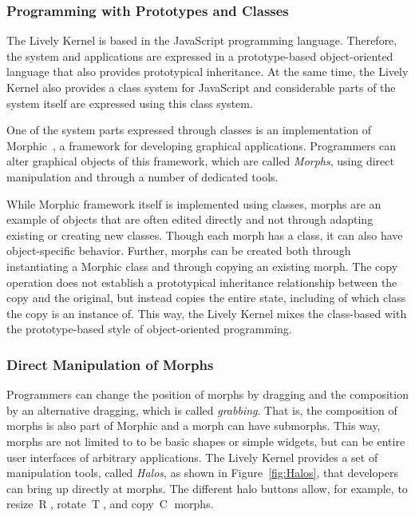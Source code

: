 \subsubsection{Programming with Prototypes and Classes}

The Lively Kernel is based in the JavaScript programming language.
Therefore, the system and applications are expressed in a prototype-based object-oriented language that also provides prototypical inheritance.
At the same time, the Lively Kernel also provides a class system for JavaScript and considerable parts of the system itself are expressed using this class system.

One of the system parts expressed through classes is an implementation of Morphic~\cite{Maloney1995Mor}, a framework for developing graphical applications.
Programmers can alter graphical objects of this framework, which are called \emph{Morphs}, using direct manipulation and through a number of dedicated tools.

While Morphic framework itself is implemented using classes, morphs are an example of objects that are often edited directly and not through adapting existing or creating new classes.
Though each morph has a class, it can also have object-specific behavior.
Further, morphs can be created both through instantiating a Morphic class and through copying an existing morph.
The copy operation does not establish a prototypical inheritance relationship between the copy and the original, but instead copies the entire state, including of which class the copy is an instance of.
This way, the Lively Kernel mixes the class-based with the prototype-based style of object-oriented programming.

\subsubsection{Direct Manipulation of Morphs}

Programmers can change the position of morphs by dragging and the composition by an alternative dragging, which is called \emph{grabbing}.
That is, the composition of morphs is also part of Morphic and a morph can have submorphs.
This way, morphs are not limited to to be basic shapes or simple widgets, but can be entire user interfaces of arbitrary applications.
The Lively Kernel provides a set of manipulation tools, called \emph{Halos}, as shown in Figure~\ref{fig:Halos}, that developers can bring up directly at morphs.
The different halo buttons allow, for example, to resize~\textcircled{R}, rotate~\textcircled{T}, and copy~\textcircled{C} morphs.

